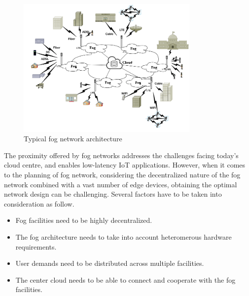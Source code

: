 \documentclass[10pt,journal,compsoc]{IEEEtran}
\newcommand{\Fig}[1]{Fig.~\ref{#1}}
\begin{document}
\begin{figure}[h]
\centerline{\includegraphics[width=3.5in]{fog-g.png}}
\caption{Typical fog network architecture} 
\label{foggg}
\end{figure}
%




The proximity offered by fog networks addresses the challenges facing today's cloud centre, and enables low-latency IoT applications.
However, when it comes to the planning of fog network, considering the decentralized nature of the fog network combined with a vast number of edge devices, obtaining the optimal network design can be challenging. Several factors have to be taken into consideration as follow.
\begin{itemize}
\item Fog facilities need to be highly decentralized.
\item The fog architecture needs to take into account heteromerous hardware requirements.
\item User demands need to be distributed across multiple facilities.
\item The center cloud needs to be able to connect and cooperate with the fog facilities.
\end{itemize}
\end{document}
